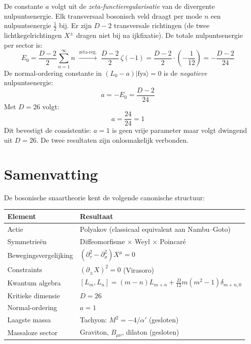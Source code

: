\documentclass[12pt,a4paper]{article}
\begin{document}
De constante $a$ volgt uit de \emph{zeta-functieregularisatie} van de divergente nulpuntsenergie. Elk transversaal bosonisch veld draagt per mode $n$ een nulpuntsenergie $\tfrac{1}{2}$ bij. Er zijn $D-2$ transversale richtingen (de twee lichtkegelrichtingen $X^\pm$ dragen niet bij na ijkfixatie). De totale nulpuntsenergie per sector is:
\begin{equation}
  E_0 = \frac{D-2}{2}\sum_{n=1}^\infty n \;\xrightarrow{\text{zeta-reg.}}\; \frac{D-2}{2}\,\zeta(-1) = \frac{D-2}{2}\cdot\left(-\frac{1}{12}\right) = -\frac{D-2}{24}
\end{equation}
De normal-ordering constante in $(L_0 - a)|\mathrm{fys}\rangle = 0$ is de \emph{negatieve} nulpuntsenergie:
\begin{equation}
  a = -E_0 = \frac{D-2}{24}
\end{equation}
Met $D = 26$ volgt:
\begin{equation}
  a = \frac{24}{24} = 1
\end{equation}
Dit bevestigt de consistentie: $a=1$ is geen vrije parameter maar volgt dwingend uit $D=26$. De twee resultaten zijn onlosmakelijk verbonden.

\section{Samenvatting}

De bosonische snaartheorie kent de volgende canonische structuur:

\begin{center}
\begin{tabular}{ll}
\hline
\textbf{Element} & \textbf{Resultaat} \\
\hline
Actie & Polyakov (classicaal equivalent aan Nambu--Goto) \\
Symmetrie\"en & Diffeomorfisme $\times$ Weyl $\times$ Poincar\'e \\
Bewegingsvergelijking & $(\partial_\tau^2 - \partial_\sigma^2)X^\mu = 0$ \\
Constraints & $(\partial_\pm X)^2 = 0$ (Virasoro) \\
Kwantum algebra & $[L_m,L_n] = (m-n)L_{m+n} + \frac{D}{12}m(m^2-1)\delta_{m+n,0}$ \\
Kritieke dimensie & $D = 26$ \\
Normal-ordering & $a = 1$ \\
Laagste massa & Tachyon: $M^2 = -4/\alpha'$ (gesloten) \\
Massaloze sector & Graviton, $B_{\mu\nu}$, dilaton (gesloten) \\
\hline
\end{tabular}
\end{center}
\end{document}
